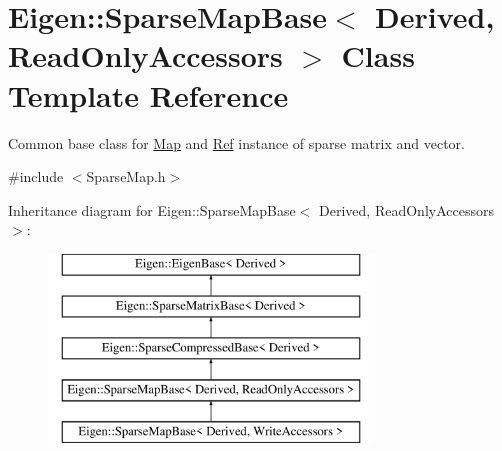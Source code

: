 \hypertarget{class_eigen_1_1_sparse_map_base_3_01_derived_00_01_read_only_accessors_01_4}{}\section{Eigen\+::Sparse\+Map\+Base$<$ Derived, Read\+Only\+Accessors $>$ Class Template Reference}
\label{class_eigen_1_1_sparse_map_base_3_01_derived_00_01_read_only_accessors_01_4}


Common base class for \mbox{\hyperlink{class_eigen_1_1_map}{Map}} and \mbox{\hyperlink{class_eigen_1_1_ref}{Ref}} instance of sparse matrix and vector.  




{\ttfamily \#include $<$Sparse\+Map.\+h$>$}

Inheritance diagram for Eigen\+::Sparse\+Map\+Base$<$ Derived, Read\+Only\+Accessors $>$\+:\begin{figure}[H]
\begin{center}
\leavevmode
\includegraphics[height=5.000000cm]{class_eigen_1_1_sparse_map_base_3_01_derived_00_01_read_only_accessors_01_4}
\end{center}
\end{figure}
